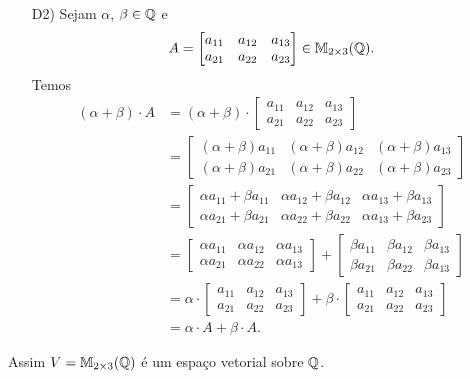 \begin{exemplo}
\begin{enumerate}[label={\arabic*})]
\begin{solucao}
\begin{itemize}
				      \item[D2)] Sejam $\alpha$, $\beta \in \mathbb{Q}$ e
					      \[
						      A = \begin{bmatrix} a_{11} & a_{12} & a_{13}\\a_{21} & a_{22} & a_{23}\end{bmatrix} \in \mathbb{M}_{2 \times 3}(\mathbb{Q}).
					      \]
					      Temos
					      \begin{align*}
						      (\alpha + \beta)\cdot A & = (\alpha + \beta)\cdot\begin{bmatrix} a_{11} & a_{12} & a_{13}\\a_{21} & a_{22} & a_{23}\end{bmatrix}
						      \\ &= \begin{bmatrix} (\alpha + \beta)a_{11} & (\alpha + \beta)a_{12} & (\alpha + \beta)a_{13}\\(\alpha + \beta)a_{21} & (\alpha + \beta)a_{22} & (\alpha + \beta)a_{23}\end{bmatrix}
						      \\ &= \begin{bmatrix} \alpha a_{11} + \beta a_{11} & \alpha a_{12} + \beta a_{12} & \alpha a_{13} + \beta a_{13}\\\alpha a_{21} + \beta a_{21} & \alpha a_{22} + \beta a_{22} & \alpha a_{13} + \beta a_{23}\end{bmatrix}
						      \\ &= \begin{bmatrix} \alpha a_{11} & \alpha a_{12} & \alpha a_{13} \\ \alpha a_{21} & \alpha a_{22} & \alpha a_{13} \end{bmatrix}
						      + \begin{bmatrix} \beta a_{11} & \beta a_{12} & \beta a_{13} \\ \beta a_{21} & \beta a_{22} & \beta a_{13} \end{bmatrix}
						      \\ &= \alpha\cdot\begin{bmatrix} a_{11} & a_{12} & a_{13}\\a_{21} & a_{22} & a_{23}\end{bmatrix}  + \beta\cdot\begin{bmatrix} a_{11} & a_{12} & a_{13}\\a_{21} & a_{22} & a_{23}\end{bmatrix}
						      \\ &= \alpha\cdot A + \beta\cdot A.
					      \end{align*}
			      \end{itemize}
			      Assim $V = \mathbb{M}_{2 \times 3}(\mathbb{Q})$ é um espaço vetorial sobre $\mathbb{Q}$.
		      \end{solucao}


\end{enumerate}
\end{exemplo}
